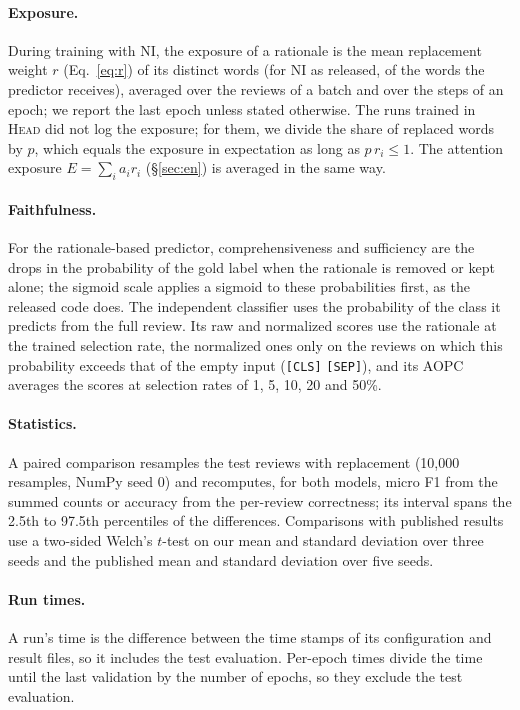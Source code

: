\documentclass[11pt]{article}
\newcommand{\HEAD}{\textup{\textsc{Head}}}
\begin{document}
\paragraph{Exposure.} During training with NI, the exposure of a rationale is the mean replacement weight $r$ (Eq.~\ref{eq:r}) of its distinct words (for NI as released, of the words the predictor receives), averaged over the reviews of a batch and over the steps of an epoch; we report the last epoch unless stated otherwise. The runs trained in \HEAD{} did not log the exposure; for them, we divide the share of replaced words by $p$, which equals the exposure in expectation as long as $p\,r_i \le 1$. The attention exposure $E = \sum_i a_i r_i$ (\S\ref{sec:en}) is averaged in the same way.

\paragraph{Faithfulness.} For the rationale-based predictor, comprehensiveness and sufficiency are the drops in the probability of the gold label when the rationale is removed or kept alone; the sigmoid scale applies a sigmoid to these probabilities first, as the released code does. The independent classifier uses the probability of the class it predicts from the full review. Its raw and normalized scores \citep{carton-etal-2020-evaluating} use the rationale at the trained selection rate, the normalized ones only on the reviews on which this probability exceeds that of the empty input (\texttt{[CLS]} \texttt{[SEP]}), and its AOPC averages the scores at selection rates of 1, 5, 10, 20 and 50\%.

\paragraph{Statistics.} A paired comparison resamples the test reviews with replacement (10,000 resamples, NumPy seed 0) and recomputes, for both models, micro F1 from the summed counts or accuracy from the per-review correctness; its interval spans the 2.5th to 97.5th percentiles of the differences. Comparisons with published results use a two-sided Welch's $t$-test on our mean and standard deviation over three seeds and the published mean and standard deviation over five seeds.

\paragraph{Run times.} A run's time is the difference between the time stamps of its configuration and result files, so it includes the test evaluation. Per-epoch times divide the time until the last validation by the number of epochs, so they exclude the test evaluation.
\end{document}
